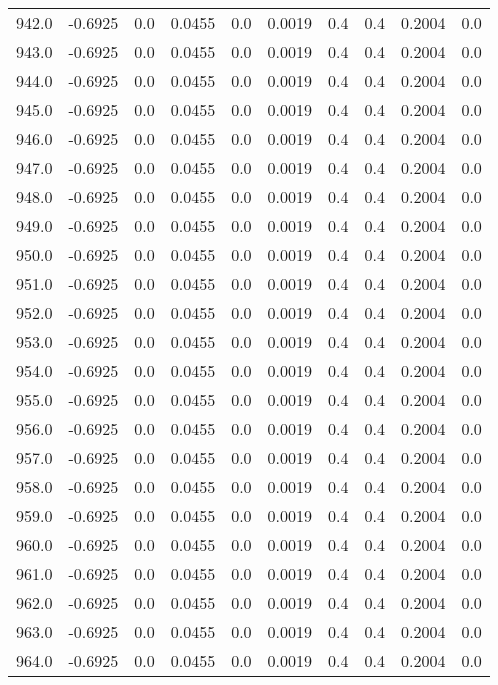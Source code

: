 \begin{longtable}{lrrrrrrrrr}
942.0 & -0.6925 & 0.0 & 0.0455 & 0.0 & 0.0019 & 0.4 & 0.4 & 0.2004 & 0.0 \\
943.0 & -0.6925 & 0.0 & 0.0455 & 0.0 & 0.0019 & 0.4 & 0.4 & 0.2004 & 0.0 \\
944.0 & -0.6925 & 0.0 & 0.0455 & 0.0 & 0.0019 & 0.4 & 0.4 & 0.2004 & 0.0 \\
945.0 & -0.6925 & 0.0 & 0.0455 & 0.0 & 0.0019 & 0.4 & 0.4 & 0.2004 & 0.0 \\
946.0 & -0.6925 & 0.0 & 0.0455 & 0.0 & 0.0019 & 0.4 & 0.4 & 0.2004 & 0.0 \\
947.0 & -0.6925 & 0.0 & 0.0455 & 0.0 & 0.0019 & 0.4 & 0.4 & 0.2004 & 0.0 \\
948.0 & -0.6925 & 0.0 & 0.0455 & 0.0 & 0.0019 & 0.4 & 0.4 & 0.2004 & 0.0 \\
949.0 & -0.6925 & 0.0 & 0.0455 & 0.0 & 0.0019 & 0.4 & 0.4 & 0.2004 & 0.0 \\
950.0 & -0.6925 & 0.0 & 0.0455 & 0.0 & 0.0019 & 0.4 & 0.4 & 0.2004 & 0.0 \\
951.0 & -0.6925 & 0.0 & 0.0455 & 0.0 & 0.0019 & 0.4 & 0.4 & 0.2004 & 0.0 \\
952.0 & -0.6925 & 0.0 & 0.0455 & 0.0 & 0.0019 & 0.4 & 0.4 & 0.2004 & 0.0 \\
953.0 & -0.6925 & 0.0 & 0.0455 & 0.0 & 0.0019 & 0.4 & 0.4 & 0.2004 & 0.0 \\
954.0 & -0.6925 & 0.0 & 0.0455 & 0.0 & 0.0019 & 0.4 & 0.4 & 0.2004 & 0.0 \\
955.0 & -0.6925 & 0.0 & 0.0455 & 0.0 & 0.0019 & 0.4 & 0.4 & 0.2004 & 0.0 \\
956.0 & -0.6925 & 0.0 & 0.0455 & 0.0 & 0.0019 & 0.4 & 0.4 & 0.2004 & 0.0 \\
957.0 & -0.6925 & 0.0 & 0.0455 & 0.0 & 0.0019 & 0.4 & 0.4 & 0.2004 & 0.0 \\
958.0 & -0.6925 & 0.0 & 0.0455 & 0.0 & 0.0019 & 0.4 & 0.4 & 0.2004 & 0.0 \\
959.0 & -0.6925 & 0.0 & 0.0455 & 0.0 & 0.0019 & 0.4 & 0.4 & 0.2004 & 0.0 \\
960.0 & -0.6925 & 0.0 & 0.0455 & 0.0 & 0.0019 & 0.4 & 0.4 & 0.2004 & 0.0 \\
961.0 & -0.6925 & 0.0 & 0.0455 & 0.0 & 0.0019 & 0.4 & 0.4 & 0.2004 & 0.0 \\
962.0 & -0.6925 & 0.0 & 0.0455 & 0.0 & 0.0019 & 0.4 & 0.4 & 0.2004 & 0.0 \\
963.0 & -0.6925 & 0.0 & 0.0455 & 0.0 & 0.0019 & 0.4 & 0.4 & 0.2004 & 0.0 \\
964.0 & -0.6925 & 0.0 & 0.0455 & 0.0 & 0.0019 & 0.4 & 0.4 & 0.2004 & 0.0 \\

\end{longtable}
